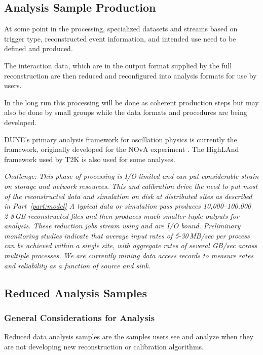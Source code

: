\documentclass[../main-v1.tex]{subfiles}
\begin{document}
\subsection{Analysis Sample Production}
At some point in the processing, specialized datasets and streams based on trigger type, reconstructed event information, and intended use need to  be defined and produced.

The interaction data, which are in the output format supplied by the full reconstruction are then reduced and reconfigured into analysis formats for use by users. 

In the long run this processing will be done as coherent production steps but may also be done by small groups while the data formats and procedures are being developed.

DUNE's primary analysis framework for oscillation physics is currently the  framework, originally developed for the NOvA experiment \cite{Backhouse:2015wlj,  bib:cafana}. The HighLAnd framework used by T2K is also used for some analyses. 





{\it Challenge:  This phase of processing is I/O limited and can put considerable strain on storage and network resources.  This and calibration drive the need to put most of the reconstructed data and simulation on disk at distributed sites as described in Part~\ref{part:model}
A typical  data or simulation pass produces  10,000--100,000 2-8\,GB reconstructed files and  then produces much smaller tuple outputs for analysis.  These reduction jobs stream using  and are I/O bound. Preliminary monitoring studies indicate that average input rates of 5-30\,MB/sec per process can be achieved within a single site, with aggregate rates of several GB/sec across multiple processes. We are currently mining data access records to measure rates and reliability as a function of source and sink. }



\subsection{Reduced Analysis Samples}

\subsubsection{General Considerations for Analysis}
Reduced data analysis samples  are the samples users see and analyze when they are not developing new reconstruction  or calibration algorithms. 
\end{document}
